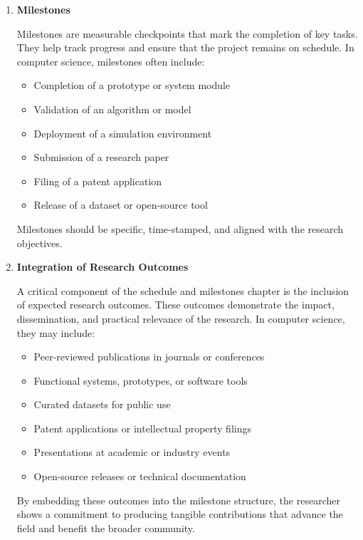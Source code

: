 \documentclass[PCOM,Proposal,Review]{mpThesis}
\newcommand{\Hd}[1]{{\color{SteelBlue}\bf#1}}
\begin{document}
\begin{MainMatter}
\begin{Remark}
\begin{enumerate}
\item \Hd{Milestones}

Milestones are measurable checkpoints that mark the completion of key tasks.
They help track progress and ensure that the project remains on schedule.
In computer science, milestones often include:
  \begin{itemize}
  \item Completion of a prototype or system module

  \item Validation of an algorithm or model

  \item Deployment of a simulation environment

  \item Submission of a research paper

  \item Filing of a patent application

  \item Release of a dataset or open-source tool
  \end{itemize}
Milestones should be specific, time-stamped, and aligned with the research objectives.

\item \Hd{Integration of Research Outcomes}

A critical component of the schedule and milestones chapter is the inclusion of expected research outcomes.
These outcomes demonstrate the impact, dissemination, and practical relevance of the research. In computer science, they may include:

  \begin{itemize}
  \item Peer-reviewed publications in journals or conferences

  \item Functional systems, prototypes, or software tools

  \item Curated datasets for public use

  \item Patent applications or intellectual property filings

  \item Presentations at academic or industry events

  \item Open-source releases or technical documentation
  \end{itemize}
By embedding these outcomes into the milestone structure, the researcher shows a commitment to producing tangible contributions that advance the field and benefit the broader community.


\end{enumerate}
\end{Remark}
\end{MainMatter}
\end{document}
